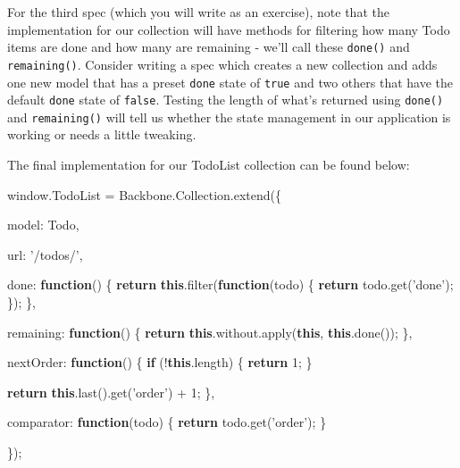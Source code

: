 \documentclass[9pt]{book}
\newenvironment{Shaded}{}{}
\newcommand{\KeywordTok}[1]{\textcolor[rgb]{0.00,0.44,0.13}{\textbf{{#1}}}}
\newcommand{\DataTypeTok}[1]{\textcolor[rgb]{0.56,0.13,0.00}{{#1}}}
\newcommand{\DecValTok}[1]{\textcolor[rgb]{0.25,0.63,0.44}{{#1}}}
\newcommand{\StringTok}[1]{\textcolor[rgb]{0.25,0.44,0.63}{{#1}}}
\newcommand{\OtherTok}[1]{\textcolor[rgb]{0.00,0.44,0.13}{{#1}}}
\newcommand{\FunctionTok}[1]{\textcolor[rgb]{0.02,0.16,0.49}{{#1}}}
\newcommand{\NormalTok}[1]{{#1}}
\begin{document}
For the third spec (which you will write as an exercise), note that the
implementation for our collection will have methods for filtering how
many Todo items are done and how many are remaining - we'll call these
\texttt{done()} and \texttt{remaining()}. Consider writing a spec which
creates a new collection and adds one new model that has a preset
\texttt{done} state of \texttt{true} and two others that have the
default \texttt{done} state of \texttt{false}. Testing the length of
what's returned using \texttt{done()} and \texttt{remaining()} will tell
us whether the state management in our application is working or needs a
little tweaking.

The final implementation for our TodoList collection can be found below:

\begin{Shaded}
\begin{Highlighting}[]
 \OtherTok{window}\NormalTok{.}\FunctionTok{TodoList} \NormalTok{= }\OtherTok{Backbone}\NormalTok{.}\OtherTok{Collection}\NormalTok{.}\FunctionTok{extend}\NormalTok{(\{}

        \DataTypeTok{model}\NormalTok{: Todo,}

        \DataTypeTok{url}\NormalTok{: }\StringTok{'/todos/'}\NormalTok{,}

        \DataTypeTok{done}\NormalTok{: }\KeywordTok{function}\NormalTok{() \{}
            \KeywordTok{return} \KeywordTok{this}\NormalTok{.}\FunctionTok{filter}\NormalTok{(}\KeywordTok{function}\NormalTok{(todo) \{ }\KeywordTok{return} \OtherTok{todo}\NormalTok{.}\FunctionTok{get}\NormalTok{(}\StringTok{'done'}\NormalTok{); \});}
        \NormalTok{\},}

        \DataTypeTok{remaining}\NormalTok{: }\KeywordTok{function}\NormalTok{() \{}
            \KeywordTok{return} \KeywordTok{this}\NormalTok{.}\OtherTok{without}\NormalTok{.}\FunctionTok{apply}\NormalTok{(}\KeywordTok{this}\NormalTok{, }\KeywordTok{this}\NormalTok{.}\FunctionTok{done}\NormalTok{());}
        \NormalTok{\},}

        \DataTypeTok{nextOrder}\NormalTok{: }\KeywordTok{function}\NormalTok{() \{}
            \KeywordTok{if} \NormalTok{(!}\KeywordTok{this}\NormalTok{.}\FunctionTok{length}\NormalTok{) \{}
                \KeywordTok{return} \DecValTok{1}\NormalTok{;}
            \NormalTok{\}}

            \KeywordTok{return} \KeywordTok{this}\NormalTok{.}\FunctionTok{last}\NormalTok{().}\FunctionTok{get}\NormalTok{(}\StringTok{'order'}\NormalTok{) + }\DecValTok{1}\NormalTok{;}
        \NormalTok{\},}

        \DataTypeTok{comparator}\NormalTok{: }\KeywordTok{function}\NormalTok{(todo) \{}
            \KeywordTok{return} \OtherTok{todo}\NormalTok{.}\FunctionTok{get}\NormalTok{(}\StringTok{'order'}\NormalTok{);}
        \NormalTok{\}}

    \NormalTok{\});}
\end{Highlighting}
\end{Shaded}
\end{document}
